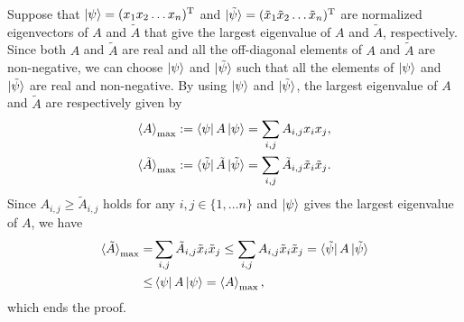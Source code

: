 \documentclass[twocolumn,superscriptaddress,pra,footinbib,notitlepage]{revtex4-1}
\newcommand{\1}{\mbox{1}\hspace{-0.25em}\mbox{l}}
\begin{document}
Suppose that $\ket{\psi}=(x_1 x_2 \dots x_n)^\mathrm{T}$ and $\ket{\tilde{\psi}}=(\tilde{x}_1 \tilde{x}_2 \dots \tilde{x}_n)^\mathrm{T}$ are normalized eigenvectors of $A$ and $\tilde{A}$ that give the largest eigenvalue of $A$ and $\tilde{A}$, respectively. Since both $A$ and $\tilde{A}$ are real and all the off-diagonal elements of $A$ and $\tilde{A}$ are non-negative, we can choose $\ket{\psi}$ and $\ket{\tilde{\psi}}$ such that all the elements of $\ket{\psi}$ and $\ket{\tilde{\psi}}$ are real and non-negative. By using $\ket{\psi}$ and $\ket{\tilde{\psi}}$, the largest eigenvalue of $A$ and $\tilde{A}$ are respectively given by
\begin{align}
\braket{A}_{\max}:=\bra{\psi}A\ket{\psi}=\sum_{i, j}A_{i, j}x_ix_j,\\
\braket{\tilde{A}}_{\max}:=\bra{\tilde{\psi}}\tilde{A}\ket{\tilde{\psi}}=\sum_{i, j}\tilde{A}_{i, j}\tilde{x}_i\tilde{x}_j.
\end{align}
Since $A_{i, j}\geq\tilde{A}_{i,j}$ holds for any $i, j\in\{1,\dots n\}$ and $\ket{\psi}$ gives the largest eigenvalue of $A$, we have
\begin{align}
\braket{\tilde{A}}_{\max}=&\sum_{i, j}\tilde{A}_{i, j}\tilde{x}_i\tilde{x}_j\leq\sum_{i, j}A_{i, j}\tilde{x}_i\tilde{x}_j=\bra{\tilde{\psi}}A\ket{\tilde{\psi}}\nonumber\\
\leq&\bra{\psi}A\ket{\psi}=\braket{A}_{\max},
\end{align}
which ends the proof.
\end{document}
